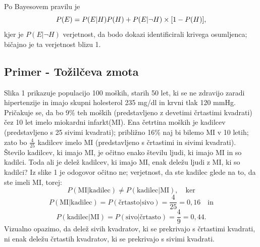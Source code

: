 \documentclass[12pt,a4paper]{amsart}
\theoremstyle{definition} %
\theoremstyle{plain} %
\begin{document}
Po Bayesovem pravilu je \vspace{3mm}
\[P(E)=P(E \lvert H)P(H) + P(E \lvert \neg H)\times[1 - P(H)], \vspace{3mm}\]
kjer je $P(E \lvert \neg H)$ verjetnost, da bodo dokazi identificirali krivega osumljenca; bičajno je ta verjetnost blizu 1. 

\subsection{Primer - Tožilčeva zmota}
Slika 1 prikazuje populacijo 100 moških, starih 50 let, ki se ne zdravijo zaradi hipertenzije in imajo skupni holesterol 235 mg/dl in krvni tlak 120 mmHg. Pričakuje
se, da bo 9\% teh moških (predstavljeno z devetimi črtastimi kvadrati) čez 10 let imelo miokardni infarkt(MI). Ena četrtina moških je kadilcev (predstavljeno s 25 
sivimi kvadrati); približno 16\% naj bi bilemo MI v 10 letih; zato bo $\frac{4}{25}$ kadilcev imelo MI (predstavljeno s črtastimi in sivimi kvadrati). \\
Število kadilcev, ki imajo MI, je očitno enako številu ljudi, ki imajo MI in so kadilci. Toda ali je delež kadilcev, ki imajo MI, enak deležu ljudi z MI, ki so kadilci? Iz 
slike 1 je odogovor očitno ne; verjetnost, da ste kadilec glede na to, da ste imeli MI, torej:
\[ P(\text{MI} \lvert \text{kadilec}) \ne P(\text{kadilec} \lvert \text{MI}), \quad \text{ker}\]
\[ P(\text{MI} \lvert \text{kadilec}) = P(\text{črtasto} \lvert \text{sivo}) = \frac{4}{25} = 0,16 \quad \text{in}\]
\[P(\text{kadilec} \lvert \text{MI}) = P(\text{sivo} \lvert \text{črtasto}) = \frac{4}{9} = 0,44.\]
Vizualno opazimo, da delež sivih kvadratov, ki se prekrivajo s črtastimi kvadrati, ni enak deležu črtastih kvadratov, ki se prekrivajo s sivimi kvadrati. 
\end{document}

